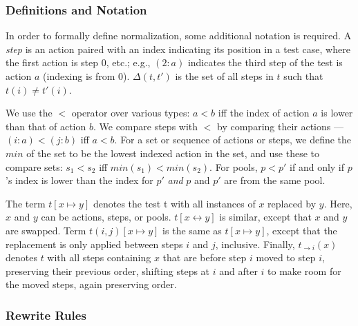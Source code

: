 \subsubsection{Definitions and Notation}

In order to formally define normalization, some additional notation is required.
A \emph{step} is an action paired with an index indicating its
position in a test case,
where the first action is step 0, etc.; e.g., $(2: a)$ indicates the
third step of the test is action $a$ (indexing is from 0). 
$\Delta(t,t')$ is the set of all steps in $t$ such that $t(i) \not= t'(i)$.

We use the $<$ operator over various types:
$a < b$ iff the index of action $a$ is lower
than that of action $b$.  We compare steps with $<$ by comparing their
actions --- $(i: a) < (j: b)$ iff $a < b$.  For a set or sequence of actions or steps, we define the $min$ of the
set to be the lowest indexed action in the set, and use
these to compare sets:  $s_1 < s_2$ iff $min(s_1) < min(s_2)$. For pools,
$p < p'$ if and only if $p$'s index is lower than the index for $p'$
\emph{and} $p$ and $p'$ are from the same pool.

The term $t[x \mapsto y]$ denotes the test t with all instances of $x$
replaced by $y$.  Here, $x$ and $y$ can be actions, steps, or pools.
$t[x \leftrightarrow y]$ is similar, except that $x$ and $y$ are
swapped.  Term $t(i,j)[x \mapsto y]$ is the same as $t[x \mapsto
y]$, except that the replacement is only applied between steps $i$ and
$j$, inclusive.  Finally, $t_{\rightarrow i}(x)$ denotes $t$ with all steps
containing $x$ that are before step $i$ moved to step $i$, preserving
their previous order, shifting steps at $i$ and after $i$ to make room for
the moved steps, again preserving order.

\subsubsection{Rewrite Rules}

